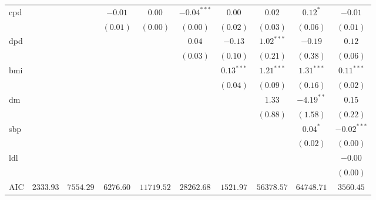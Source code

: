 \begin{tabular}{l c c c c c c c c c}
cpd              &               &               & $-0.01$       & $0.00$        & $-0.04^{***}$ & $0.00$         & $0.02$        & $0.12^{*}$    & $-0.01$        \\
                 &               &               & $(0.01)$      & $(0.00)$      & $(0.00)$      & $(0.02)$       & $(0.03)$      & $(0.06)$      & $(0.01)$       \\
dpd              &               &               &               &               & $0.04$        & $-0.13$        & $1.02^{***}$  & $-0.19$       & $0.12$         \\
                 &               &               &               &               & $(0.03)$      & $(0.10)$       & $(0.21)$      & $(0.38)$      & $(0.06)$       \\
bmi              &               &               &               &               &               & $0.13^{***}$   & $1.21^{***}$  & $1.31^{***}$  & $0.11^{***}$   \\
                 &               &               &               &               &               & $(0.04)$       & $(0.09)$      & $(0.16)$      & $(0.02)$       \\
dm               &               &               &               &               &               &                & $1.33$        & $-4.19^{**}$  & $0.15$         \\
                 &               &               &               &               &               &                & $(0.88)$      & $(1.58)$      & $(0.22)$       \\
sbp              &               &               &               &               &               &                &               & $0.04^{*}$    & $-0.02^{***}$  \\
                 &               &               &               &               &               &                &               & $(0.02)$      & $(0.00)$       \\
ldl              &               &               &               &               &               &                &               &               & $-0.00$        \\
                 &               &               &               &               &               &                &               &               & $(0.00)$       \\
\midrule
AIC              & $2333.93$     & $7554.29$     & $6276.60$     & $11719.52$    & $28262.68$    & $1521.97$      & $56378.57$    & $64748.71$    & $3560.45$      \\

\end{tabular}
